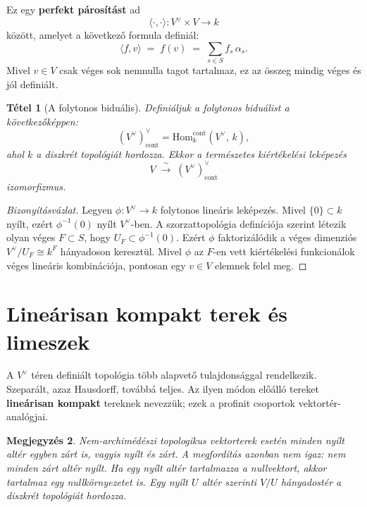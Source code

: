 \documentclass[12pt]{article}
\newtheorem{theorem}{Tétel}[section]
\newtheorem{remark}[theorem]{Megjegyzés}
\newcommand{\Hom}{\mathrm{Hom}}
\begin{document}
Ez egy \textbf{perfekt párosítást} ad
\[
  \langle \cdot, \cdot \rangle : V^{\vee} \times V \to k
\]
között, amelyet a következő formula definiál:
\[
  \langle f, v \rangle \;=\; f(v) \;=\; \sum_{s \in S} f_s\, \alpha_s.
\]
Mivel $v \in V$ csak véges sok nemnulla tagot tartalmaz, ez az összeg mindig véges és jól definiált.

\begin{theorem}[A folytonos biduális]
  Definiáljuk a folytonos biduálist a következőképpen:
  \[
    (V^{\vee})^{\vee}_{\mathrm{cont}} = \Hom_k^{\mathrm{cont}}(V^{\vee},\, k),
  \]
  ahol $k$ a diszkrét topológiát hordozza. Ekkor a természetes kiértékelési leképezés
  \[
    V \;\xrightarrow{\;\sim\;}\; (V^{\vee})^{\vee}_{\mathrm{cont}}
  \]
  izomorfizmus.
\end{theorem}

\begin{proof}[Bizonyításvázlat]
  Legyen $\phi : V^{\vee} \to k$ folytonos lineáris leképezés. Mivel $\{0\} \subset k$ nyílt, ezért $\phi^{-1}(0)$ nyílt $V^{\vee}$-ben. A szorzattopológia definíciója szerint létezik olyan véges $F \subset S$, hogy $U_F \subset \phi^{-1}(0)$. Ezért $\phi$ faktorizálódik a véges dimenziós $V^{\vee}/U_F \cong k^F$ hányadoson keresztül. Mivel $\phi$ az $F$-en vett kiértékelési funkcionálok véges lineáris kombinációja, pontosan egy $v \in V$ elemnek felel meg.
\end{proof}

\section{Lineárisan kompakt terek és limeszek}

A $V^\vee$ téren definiált topológia több alapvető tulajdonsággal rendelkezik. Szeparált, azaz Hausdorff, továbbá teljes. Az ilyen módon előálló tereket \textbf{lineárisan kompakt} tereknek nevezzük; ezek a profinit csoportok vektortér-analógjai.

\begin{remark}
  Nem-archimédészi topologikus vektorterek esetén minden nyílt altér egyben zárt is, vagyis nyílt és zárt. A megfordítás azonban nem igaz: nem minden zárt altér nyílt. Ha egy nyílt altér tartalmazza a nullvektort, akkor tartalmaz egy nullkörnyezetet is. Egy nyílt $U$ altér szerinti $V/U$ hányadostér a diszkrét topológiát hordozza.
\end{remark}
\end{document}
